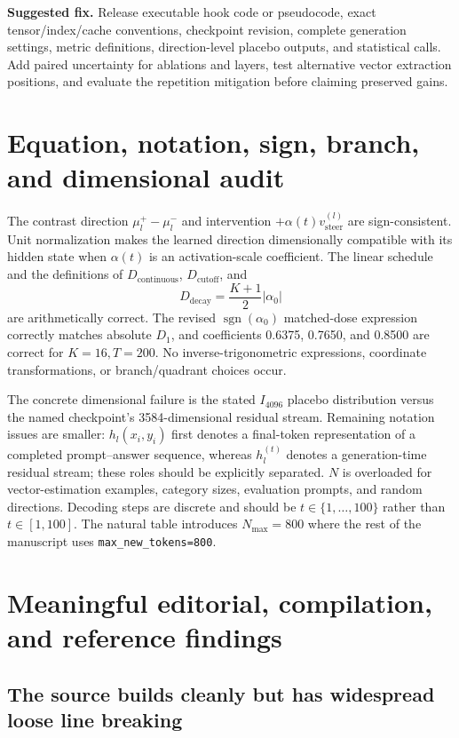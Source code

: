 \documentclass[11pt]{article}
\newcommand{\findinglabel}[1]{\textbf{#1}}
\begin{document}
\findinglabel{Suggested fix.} Release executable hook code or pseudocode, exact tensor/index/cache conventions, checkpoint revision, complete generation settings, metric definitions, direction-level placebo outputs, and statistical calls.  Add paired uncertainty for ablations and layers, test alternative vector extraction positions, and evaluate the repetition mitigation before claiming preserved gains.

\section*{Equation, notation, sign, branch, and dimensional audit}

The contrast direction $\mu_l^+-\mu_l^-$ and intervention $+\alpha(t)v_{\text{steer}}^{(l)}$ are sign-consistent.  Unit normalization makes the learned direction dimensionally compatible with its hidden state when $\alpha(t)$ is an activation-scale coefficient.  The linear schedule and the definitions of $D_{\text{continuous}}$, $D_{\text{cutoff}}$, and
\[
D_{\text{decay}}=\frac{K+1}{2}|\alpha_0|
\]
are arithmetically correct.  The revised $\operatorname{sgn}(\alpha_0)$ matched-dose expression correctly matches absolute $D_1$, and coefficients 0.6375, 0.7650, and 0.8500 are correct for $K=16,T=200$.  No inverse-trigonometric expressions, coordinate transformations, or branch/quadrant choices occur.

The concrete dimensional failure is the stated $I_{4096}$ placebo distribution versus the named checkpoint's 3584-dimensional residual stream.  Remaining notation issues are smaller: $h_l(x_i,y_i)$ first denotes a final-token representation of a completed prompt--answer sequence, whereas $h_l^{(t)}$ denotes a generation-time residual stream; these roles should be explicitly separated.  $N$ is overloaded for vector-estimation examples, category sizes, evaluation prompts, and random directions.  Decoding steps are discrete and should be $t\in\{1,\ldots,100\}$ rather than $t\in[1,100]$.  The natural table introduces $N_{\text{max}}=800$ where the rest of the manuscript uses \texttt{max\_new\_tokens=800}.

\section*{Meaningful editorial, compilation, and reference findings}

\subsection*{The source builds cleanly but has widespread loose line breaking}
\end{document}
